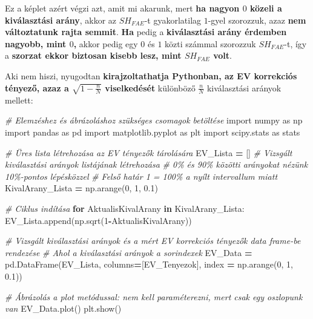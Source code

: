 \documentclass[
]{book}
\newenvironment{Shaded}{\begin{snugshade}}{\end{snugshade}}
\newcommand{\CommentTok}[1]{\textcolor[rgb]{0.56,0.35,0.01}{\textit{#1}}}
\newcommand{\ControlFlowTok}[1]{\textcolor[rgb]{0.13,0.29,0.53}{\textbf{#1}}}
\newcommand{\DecValTok}[1]{\textcolor[rgb]{0.00,0.00,0.81}{#1}}
\newcommand{\FloatTok}[1]{\textcolor[rgb]{0.00,0.00,0.81}{#1}}
\newcommand{\ImportTok}[1]{#1}
\newcommand{\KeywordTok}[1]{\textcolor[rgb]{0.13,0.29,0.53}{\textbf{#1}}}
\newcommand{\NormalTok}[1]{#1}
\newcommand{\OperatorTok}[1]{\textcolor[rgb]{0.81,0.36,0.00}{\textbf{#1}}}
\newcommand{\StringTok}[1]{\textcolor[rgb]{0.31,0.60,0.02}{#1}}
\begin{document}
Ez a képlet azért végzi azt, amit mi akarunk, mert \textbf{ha nagyon \(0\) közeli a kiválasztási arány}, akkor az \(SH_{FAE}\)-t gyakorlatilag \(1\)-gyel szorozzuk, azaz \textbf{nem változtatunk rajta semmit}. \textbf{Ha} pedig a \textbf{kiválasztási arány érdemben nagyobb, mint \(0\),} akkor pedig egy \(0\) és \(1\) közti számmal szorozzuk \(SH_{FAE}\)-t, így a \textbf{szorzat ekkor biztosan kisebb lesz, mint \(SH_{FAE}\) volt}.

Aki nem hiszi, nyugodtan \textbf{kirajzoltathatja Pythonban, az EV korrekciós tényező, azaz a \(\sqrt{1-\frac{n}{N}}\) viselkedését} különböző \(\frac{n}{N}\) kiválasztási arányok mellett:

\begin{Shaded}
\begin{Highlighting}[]
\CommentTok{\# Elemzéshez és ábrázoláshoz szükséges csomagok betöltése}
\ImportTok{import}\NormalTok{ numpy }\ImportTok{as}\NormalTok{ np}
\ImportTok{import}\NormalTok{ pandas }\ImportTok{as}\NormalTok{ pd}
\ImportTok{import}\NormalTok{ matplotlib.pyplot }\ImportTok{as}\NormalTok{ plt}
\ImportTok{import}\NormalTok{ scipy.stats }\ImportTok{as}\NormalTok{ stats}

\CommentTok{\# Üres lista létrehozása az EV tényezők tárolására}
\NormalTok{EV\_Lista }\OperatorTok{=}\NormalTok{ []}
\CommentTok{\# Vizsgált kiválasztási arányok listájának létrehozása}
\CommentTok{\# 0\% és 90\% közötti arányokat nézünk 10\%{-}pontos lépésközzel}
\CommentTok{\# Felső határ 1 = 100\% a nyílt intervallum miatt}
\NormalTok{KivalArany\_Lista }\OperatorTok{=}\NormalTok{ np.arange(}\DecValTok{0}\NormalTok{, }\DecValTok{1}\NormalTok{, }\FloatTok{0.1}\NormalTok{)}

\CommentTok{\# Ciklus indítása}
\ControlFlowTok{for}\NormalTok{ AktualisKivalArany }\KeywordTok{in}\NormalTok{ KivalArany\_Lista:}
\NormalTok{  EV\_Lista.append(np.sqrt(}\DecValTok{1}\OperatorTok{{-}}\NormalTok{AktualisKivalArany))}

\CommentTok{\# Vizsgált kiválasztási arányok és a mért EV korrekciós tényezők data frame{-}be rendezése}
\CommentTok{\# Ahol a kiválasztási arányok a sorindexek}
\NormalTok{EV\_Data }\OperatorTok{=}\NormalTok{ pd.DataFrame(EV\_Lista, columns}\OperatorTok{=}\NormalTok{[}\StringTok{\textquotesingle{}EV\_Tenyezok\textquotesingle{}}\NormalTok{], index }\OperatorTok{=}\NormalTok{ np.arange(}\DecValTok{0}\NormalTok{, }\DecValTok{1}\NormalTok{, }\FloatTok{0.1}\NormalTok{))}

\CommentTok{\# Ábrázolás a \textquotesingle{}plot\textquotesingle{} metódussal: nem kell paraméterezni, mert csak egy oszlopunk van}
\NormalTok{EV\_Data.plot()}
\NormalTok{plt.show()}
\end{Highlighting}
\end{Shaded}
\end{document}
